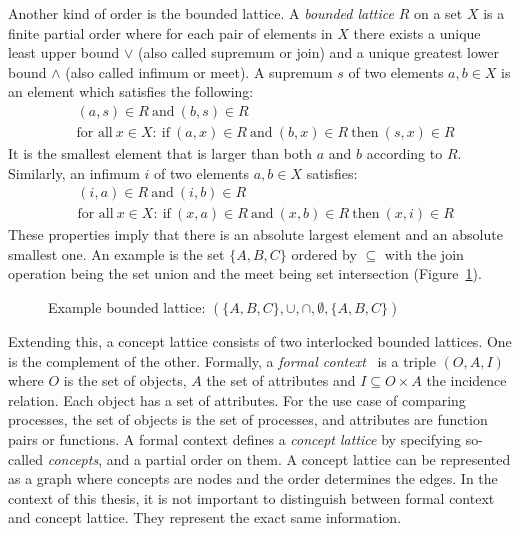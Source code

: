 \documentclass[a4paper, final, diplominf]{zih-template}
\begin{document}
Another kind of order is the bounded lattice.
A \emph{bounded lattice} $R$ on a set $X$ is a finite partial order where for each pair of elements in $X$ there exists a unique least upper bound $\vee$ (also called supremum or join) and a unique greatest lower bound $\wedge$ (also called infimum or meet).
A supremum $s$ of two elements $a, b \in X$ is an element which satisfies the following:
\begin{equation*}
	\begin{aligned}
		& (a, s) \in R ~\text{and}~ (b, s) \in R \\
		& \text{for all}~ x \in X: ~\text{if}~ (a, x) \in R ~\text{and}~ (b, x) \in R ~\text{then}~ (s, x) \in R
	\end{aligned}
\end{equation*}
It is the smallest element that is larger than both $a$ and $b$ according to $R$.
Similarly, an infimum $i$ of two elements $a, b \in X$ satisfies:
\begin{equation*}
	\begin{aligned}
		& (i, a) \in R ~\text{and}~ (i, b) \in R \\
		& \text{for all}~ x \in X: ~\text{if}~ (x, a) \in R ~\text{and}~ (x, b) \in R ~\text{then}~ (x, i) \in R
	\end{aligned}
\end{equation*}
These properties imply that there is an absolute largest element and an absolute smallest one.
An example is the set $\{ A, B, C \}$ ordered by $\subseteq$ with the join operation being the set union and the meet being set intersection (Figure~\ref{fig:bounded-lattice-example}).
\begin{figure}[tb]
	\centering
	
	\caption{Example bounded lattice: $(\{A, B, C\}, \cup, \cap, \emptyset, \{ A, B, C \})$}
	\label{fig:bounded-lattice-example}
\end{figure}

Extending this, a concept lattice consists of two interlocked bounded lattices.
One is the complement of the other.
Formally, a \emph{formal context}~\cite{ganter99} is a triple $(O, A, I)$ where $O$ is the set of objects, $A$ the set of attributes and $I \subseteq O \times A$ the incidence relation.
Each object has a set of attributes.
For the use case of comparing processes, the set of objects is the set of processes, and attributes are function pairs or functions.
A formal context defines a \emph{concept lattice} by specifying so-called \emph{concepts}, and a partial order on them.
A concept lattice can be represented as a graph where concepts are nodes and the order determines the edges.
In the context of this thesis, it is not important to distinguish between formal context and concept lattice.
They represent the exact same information.
\end{document}
